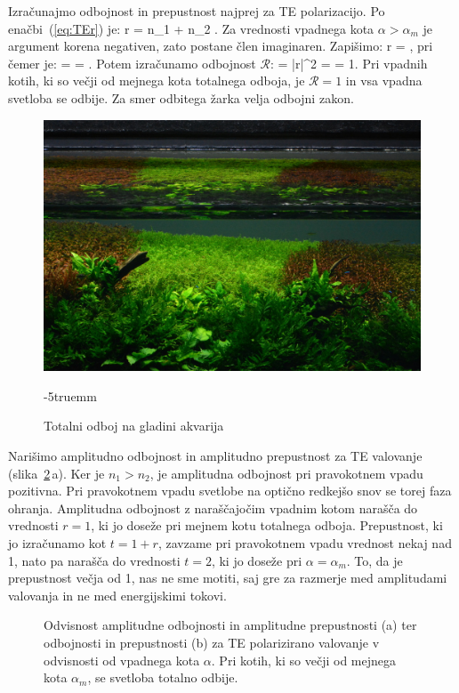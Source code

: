 Izračunajmo odbojnost in prepustnost najprej za TE polarizacijo.
Po enačbi~(\ref{eq:TEr}) je:
\beq
r = 
{n_1 \cos \alpha + n_2 }.
\label{eq:04_53}
\eeq
Za vrednosti vpadnega kota $\alpha > \alpha_m$ je argument korena
negativen, zato postane člen imaginaren. Zapišimo:
\beq
r = ,
\label{eq:04_54}
\eeq
pri čemer je:
\beq
\kappa =   = 
.
\label{eq:04_55}
\eeq
Potem izračunamo odbojnost $\mathcal{R}$:
\beq
{} = |r|^2 = 
\cdot {} = 1.
\label{eq:04_56}
\eeq
Pri vpadnih kotih, ki so večji od mejnega kota totalnega odboja, je $\mathcal{R} = 1$
in vsa vpadna svetloba se odbije. Za smer odbitega žarka velja odbojni zakon. 
\begin{figure}[ht]
\centering
\includegraphics[width=10truecm]{slike/04_TotalniOdbojFoto.jpg}
\caption{Totalni odboj na gladini akvarija}
\vglue-5truemm
\label{fig:04_TotalniFoto}
\end{figure}

Narišimo amplitudno odbojnost in amplitudno prepustnost za TE valovanje 
(slika~\ref{fig:04_goste}\,a). 
Ker je $n_1>n_2$, je amplitudna odbojnost pri pravokotnem vpadu pozitivna. 
Pri pravokotnem vpadu svetlobe na optično redkejšo snov se torej
faza ohranja. Amplitudna odbojnost z naraščajočim vpadnim kotom narašča 
do vrednosti $r=1$, ki jo doseže pri mejnem kotu totalnega odboja. 
Prepustnost, ki jo izračunamo
kot $t = 1+r$, zavzame pri pravokotnem vpadu vrednost nekaj nad 1,
nato pa narašča do vrednosti $t=2$, ki jo doseže pri $\alpha = \alpha_m$. 
To, da je prepustnost večja od 1, nas ne sme motiti, saj gre za
razmerje med amplitudami valovanja in ne med energijskimi tokovi.
\begin{figure}[ht]
\centering
\def\svgwidth{140truemm} 

\caption{Odvisnost amplitudne odbojnosti in amplitudne prepustnosti (a) ter odbojnosti in 
prepustnosti (b) za TE polarizirano valovanje v odvisnosti od vpadnega kota $\alpha$. 
Pri kotih, ki so večji od mejnega kota $\alpha_m$, se svetloba totalno odbije.}
\label{fig:04_goste}
\end{figure}

